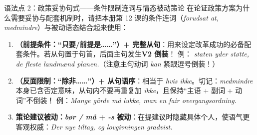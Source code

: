 \begin{grammatikbox}{语法点 2：政策妥协句式——条件限制连词与情态被动策论}
在论证政策方案为什么需要妥协与配套机制时，请把本册第 12 课的条件连词（\textit{forudsat at, medmindre}）与被动语态结合起来使用：
\begin{enumerate}
  \item \textbf{（前提条件：“只要/前提是……”）+ 完整从句}：用来设定改革成功的必备配套条件。若从句置于句首，后面主句发生\textbf{V2 倒装}！\newline
  例：\textit{ staten yder støtte,  de fleste landmænd  planen.}（注意主句动词 \textit{kan} 紧跟逗号倒装！）
  \item \textbf{（反面限制：“除非……”）+ 从句语序}：相当于 \textit{hvis ikke}。切记：\textit{medmindre} 本身已含否定意味，从句内不要再重复加 \textit{ikke}，且保持“主语 + 副词 + 动词”不倒装！\newline
  例：\textit{Mange gårde må lukke,  man  en fair overgangsordning.}
  \item \textbf{策论建议被动：\textit{bør / må} + \textit{-s} 被动}：在提建议时隐藏具体个人，使语气更客观权威：\textit{Der  nye tiltag, og lovgivningen  gradvist.}
\end{enumerate}
\end{grammatikbox}

